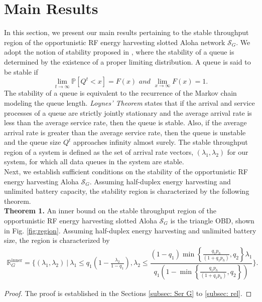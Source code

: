 \documentclass[draftcls,12pt,onecolumn]{IEEEtran}
\begin{document}
\section{Main Results} \label{sec:Main_Results}
In this section, we present our main results pertaining to the stable throughput region of 
the opportunistic RF energy harvesting slotted Aloha network $\mathcal{S}_G$. We adopt the notion of stability proposed in \cite{szpankowski}, where the stability of a queue is determined by the existence of a proper limiting distribution. A queue is said to be stable if 
\begin{equation}  
\lim_{t \rightarrow \infty} \mathbb{P}[Q^t < x]=F(x) \textit{ and } \lim_{x \rightarrow \infty} F(x)=1.
\end{equation}
\indent The stability of a queue is equivalent to the recurrence of the Markov chain modeling the queue length. \emph{Loynes' Theorem} \cite{loynes} states that if the arrival and service processes of a queue are strictly jointly stationary and the average arrival rate is less than the average service rate, then the queue is stable. Also, if the average arrival rate is greater than the average service rate, then the queue is unstable and the queue size $Q^t$ approaches infinity almost surely. The stable throughput region of a system is defined as the set of arrival rate vectors, $(\lambda_1,\lambda_2)$ for our system, for which all data queues in the system are stable.\\
\indent Next, we establish sufficient conditions on the stability of the opportunistic RF energy harvesting Aloha $\mathcal{S}_G$. Assuming half-duplex energy harvesting and unlimited battery capacity, the stability region is characterized by the following theorem.\\
\indent \textbf{Theorem 1.} An inner bound on the stable throughput region of the opportunistic RF energy harvesting slotted Aloha $\mathcal{S}_G$ is the triangle OBD, shown in Fig. \ref{fig:region}. Assuming half-duplex energy harvesting and unlimited battery size, the region is characterized by  
\begin{align} \label{eqn thm1}
\mathbb{R}_G^{\text{inner}}= \bigg\{  (\lambda_1, \lambda_2) \ \big | \ \lambda_1 \leq  q_1 \left( 1- \frac{\lambda_2}{1-q_1}\right),  \lambda_2 \leq  \dfrac{(1-q_1) \min \left\lbrace \frac{q_1 p_h}{ (1+ q_1 p_h)}, q_2 \right\rbrace \lambda_1}{q_1 \left( 1- \min \left\lbrace \frac{q_1 p_h}{ (1+ q_1 p_h)}, q_2 \right\rbrace \right)} \bigg\}. 
\end{align}
\begin{proof}
The proof is established in the Sections \ref{subsec: Ser G} to \ref{subsec: rel}.
\end{proof}
\end{document}
